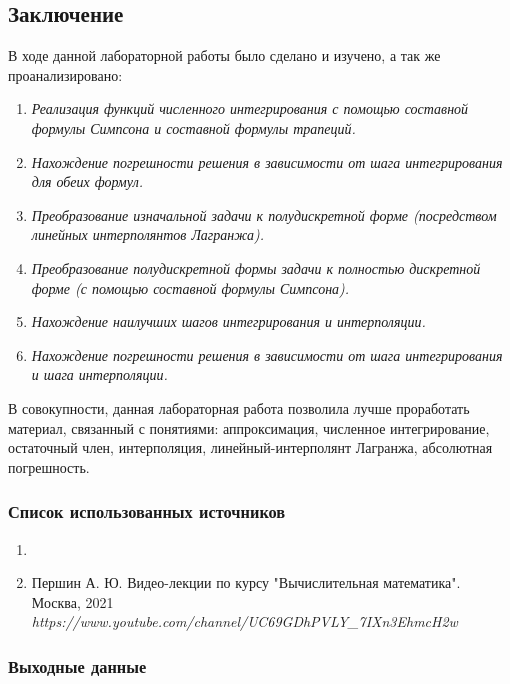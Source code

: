 \subsection{Заключение}
В ходе данной лабораторной работы было сделано и изучено, а так же проанализировано:
\begin{enumerate}
	\item \textit{Реализация функций численного интегрирования с помощью составной формулы Симпсона и составной формулы трапеций.}
	\item \textit{Нахождение погрешности решения в зависимости от шага интегрирования для обеих формул.}
	\item \textit{Преобразование изначальной задачи к полудискретной форме (посредством линейных интерполянтов Лагранжа).}
	\item \textit{Преобразование полудискретной формы задачи к полностью дискретной форме (с помощью составной формулы Симпсона).}
	\item \textit{Нахождение наилучших шагов интегрирования и интерполяции.}
	\item \textit{Нахождение погрешности решения в зависимости от шага интегрирования и шага интерполяции.}
\end{enumerate}
В совокупности, данная лабораторная работа позволила лучше проработать материал, связанный с понятиями: аппроксимация, численное интегрирование, остаточный член, интерполяция, линейный-интерполянт Лагранжа, абсолютная погрешность.


\subsubsection*{Список использованных источников}

\begin{enumerate}
	\item {}
    \item Першин А. Ю. Видео-лекции по курсу "Вычислительная математика". Москва, 2021
    \textit{https://www.youtube.com/channel/UC69GDhPVLY_7IXn3EhmcH2w}
\end{enumerate}

\subsubsection*{Выходные данные}

\textit{\DocOutReference}

